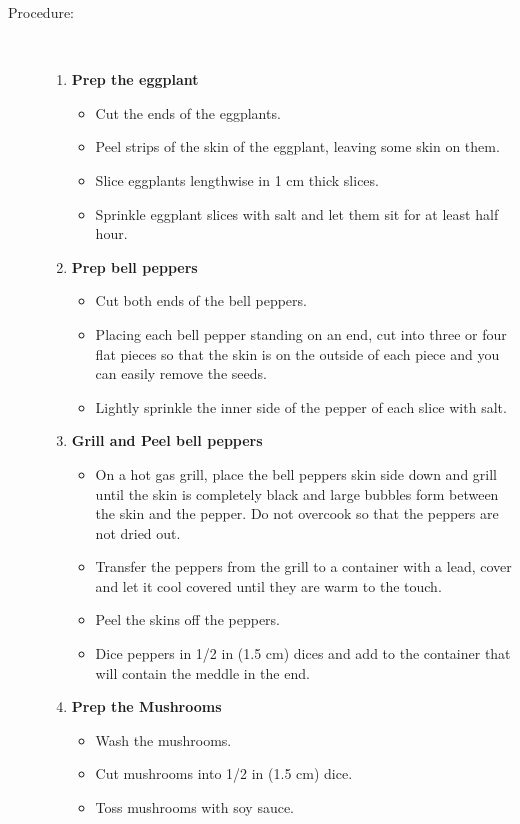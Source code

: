 \documentclass [11pt, letterpaper] {article}
\begin{document}
\begin{description}
\item[Procedure:]\ \\
	\begin{enumerate}
	\item {\bf Prep the eggplant}
	\begin{itemize}
	\item Cut the ends of the eggplants.
	\item Peel strips of the skin of the eggplant, leaving some skin on them.
	\item Slice eggplants lengthwise in 1 cm thick slices.
	\item Sprinkle eggplant slices with salt and let them sit for at least half hour.
	\end{itemize}
	\item {\bf Prep bell peppers}
	\begin{itemize}
	\item Cut both ends of the bell peppers.
	\item Placing each bell pepper standing on an end, cut into three or four flat pieces so that the skin is on the outside of each piece and you can easily remove the seeds.
	\item Lightly sprinkle the inner side of the pepper of each slice with salt.
	\end{itemize}
	\item {\bf Grill and Peel bell peppers}
	\begin{itemize}
	\item On a hot gas grill, place the bell peppers skin side down and grill until the skin is completely black and large bubbles form between the skin and the pepper. Do not overcook so that the peppers are not dried out.
	\item Transfer the peppers from the grill to a container with a lead, cover and let it cool covered until they are warm to the touch.
	\item Peel the skins off the peppers.
	\item Dice peppers in 1/2 in (1.5 cm) dices and add to the container that will contain the meddle in the end.
	\end{itemize}
	\item {\bf Prep the Mushrooms}
	\begin{itemize}
        		\item Wash the mushrooms.
		\item Cut mushrooms into 1/2 in (1.5 cm) dice.
		\item Toss mushrooms with soy sauce.
	\end{itemize}

\end{enumerate}
\end{description}
\end{document}
